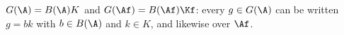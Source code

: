 $G(\A)=B(\A)K$ and $G(\Af)=B(\Af)\Kf$: every $g\in G(\A)$ can be written $g=bk$ with $b\in B(\A)$ and $k\in K$, and
likewise over $\Af$.
